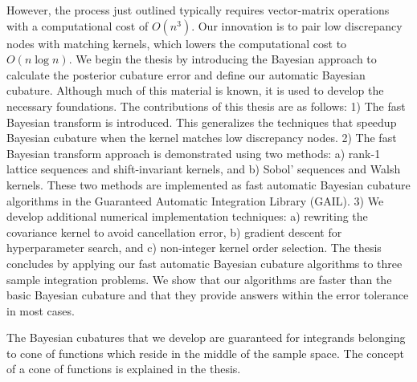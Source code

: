 \documentclass[11pt]{report}
\begin{document}
	However, the process just outlined typically requires vector-matrix operations  with a computational cost of $O(n^3)$. Our innovation is to pair low discrepancy nodes with matching kernels, which lowers the computational cost to $O(n \log n)$. 
	We begin the thesis by introducing the Bayesian approach to calculate the posterior cubature error and define our automatic Bayesian cubature. Although much of this material is known, it is used to develop the necessary foundations.
	The contributions of this thesis are as follows:
1) The fast Bayesian transform is introduced. This generalizes the techniques that speedup Bayesian cubature when the kernel matches low discrepancy nodes.
2) The fast Bayesian transform approach is demonstrated using two methods: a) rank-1 lattice sequences and shift-invariant kernels, and b) Sobol' sequences and Walsh kernels.
These two methods are implemented as fast automatic Bayesian cubature algorithms in the Guaranteed Automatic Integration Library (GAIL).
3) We develop additional numerical implementation techniques: 
a) rewriting the covariance kernel to avoid cancellation error, 
b) gradient descent for hyperparameter search, and
c) non-integer kernel order selection.
	The thesis concludes by applying our fast automatic Bayesian cubature algorithms to three sample integration problems. We show that our algorithms are faster than the basic Bayesian cubature and that they provide answers within the error tolerance in most cases. %
	
	The Bayesian cubatures that we develop are guaranteed for integrands belonging to cone of functions which reside in the middle of the sample space. The concept of a cone of functions is explained in the thesis.
	


\end{document}
